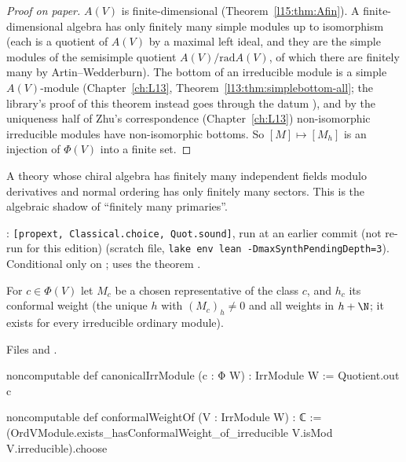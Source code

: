 \begin{proof}[Proof on paper]
$A(V)$ is finite-dimensional (Theorem~\ref{l15:thm:Afin}). A finite-dimensional algebra has only finitely many simple
modules up to isomorphism (each is a quotient of $A(V)$ by a maximal left ideal, and they are the simple modules of the
semisimple quotient $A(V)/\mathrm{rad}A(V)$, of which there are finitely many by Artin--Wedderburn). The bottom of an
irreducible module is a simple $A(V)$-module (Chapter~\ref{ch:L13}, Theorem~\ref{l13:thm:simplebottom-all}; the
library's proof of this theorem instead goes through the datum ), and by the uniqueness half of Zhu's correspondence
(Chapter~\ref{ch:L13}) non-isomorphic irreducible modules have non-isomorphic bottoms. So $[M]\mapsto[M_h]$ is an
injection of $\Phi(V)$ into a finite set.
\end{proof}

\begin{physics}
A theory whose chiral algebra has finitely many independent fields modulo derivatives and normal ordering has only finitely
many sectors. This is the algebraic shadow of ``finitely many primaries''.
\end{physics}

\begin{status}
: \texttt{[propext, Classical.choice, Quot.sound]}, run at
an earlier commit (not re-run for this edition) (scratch file, \texttt{lake env lean -DmaxSynthPendingDepth=3}). Conditional only on ;
uses the theorem .
\end{status}

\begin{definition}\label{l15:def:canonical}
For $c\in\Phi(V)$ let $M_c$ be a chosen representative of the class $c$, and $h_c$ its conformal weight (the unique $h$ with
$(M_c)_h\neq0$ and all weights in $h+\N$; it exists for every irreducible ordinary module).
\end{definition}
\noindent Files  and
.
\begin{leancode}
noncomputable def canonicalIrrModule (c : Φ W) : IrrModule W := Quotient.out c

noncomputable def conformalWeightOf (V : IrrModule W) : ℂ :=
  (OrdVModule.exists_hasConformalWeight_of_irreducible V.isMod V.irreducible).choose
\end{leancode}


